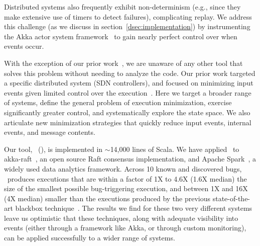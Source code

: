 Distributed systems also frequently exhibit non-determinism (e.g., since they
make extensive use of timers to detect failures), complicating replay. We address this
challenge (as we discuss in
section~\ref{dsec:implementation}) by
instrumenting the Akka actor system framework~\cite{akka} to gain nearly perfect control over when
events occur.

With the exception of our prior work~\cite{sts2014}, we are unaware of any other
tool that solves this problem without needing to analyze the code.
Our prior work targeted a specific distributed system (SDN controllers), and focused
on minimizing input events given limited control over the execution~\cite{sts2014}.
Here we target a broader range of systems, define the
general problem of execution minimization, exercise significantly greater
control, and systematically explore the state space. We also articulate new minimization
strategies that quickly reduce input events,
internal events, and message contents.



Our tool, \system~(\sys), is implemented in {\footnotesize $\sim$}14,000
lines of Scala. We have applied \sys~to akka-raft~\cite{akka-raft}, an open
source Raft consensus implementation, and Apache Spark~\cite{zaharia2012resilient}, a widely used data analytics framework.
Across 10 known and discovered bugs, \sys~produces executions that are within
a factor of 1X to 4.6X (1.6X median) the size of the smallest possible
bug-triggering execution,
and between 1X and 16X (4X median) smaller than the
executions produced by the previous state-of-the-art blackbox technique~\cite{sts2014}.
The results we find for these two very different systems leave us optimistic that these
techniques, along with adequate visibility into events (either through a
framework like Akka, or through
custom monitoring), can be applied successfully to a wider range of systems.


